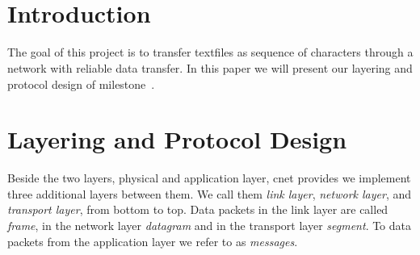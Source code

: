 
\title{\Large \lecture \\ \textbf{\normalsize \assignment}}
\author{\authors}

\setlength \headheight{25pt}
\fancyhead[L]{\authors}




\maketitle

\section{Introduction}
The goal of this project is to transfer textfiles as sequence of characters through a network with reliable data transfer. In this paper we will present our layering and protocol design of milestone~.

\section{Layering and Protocol Design}

Beside the two layers, physical and application layer, cnet provides we implement three additional layers between them. We call them \emph{link layer}, \emph{network layer}, and \emph{transport layer}, from bottom to top. Data packets in the link layer are called \emph{frame}, in the network layer \emph{datagram} and in the transport layer \emph{segment}. To data packets from the application layer we refer to as \emph{messages}.


